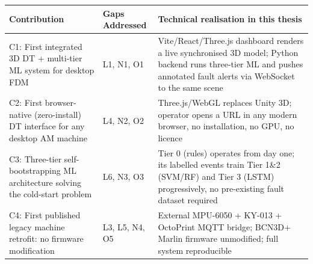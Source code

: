 \begin{tabular}{|p{3.5cm}|p{2.5cm}|p{8cm}|}
	\hline
	\rowcolor{primary}
	\textbf{\color{white}Contribution} & \textbf{\color{white}Gaps Addressed} & \textbf{\color{white}Technical realisation in this thesis} \\
	\hline
	C1: First integrated 3D DT + multi-tier ML system for desktop FDM & L1, N1, O1 & Vite/React/Three.js dashboard renders a live synchronised 3D model; Python backend runs three-tier ML and pushes annotated fault alerts via WebSocket to the same scene \\
	\hline
	C2: First browser-native (zero-install) DT interface for any desktop AM machine & L4, N2, O2 & Three.js/WebGL replaces Unity 3D; operator opens a URL in any modern browser, no installation, no GPU, no licence \\
	\hline
	C3: Three-tier self-bootstrapping ML architecture solving the cold-start problem & L6, N3, O3 & Tier 0 (rules) operates from day one; its labelled events train Tier 1\&2 (SVM/RF) and Tier 3 (LSTM) progressively, no pre-existing fault dataset required \\
	\hline
	C4: First published legacy machine retrofit: no firmware modification & L3, L5, N4, O5 & External MPU-6050 + KY-013 + OctoPrint MQTT bridge; BCN3D+ Marlin firmware unmodified; full system reproducible \\
	\hline
\end{tabular}